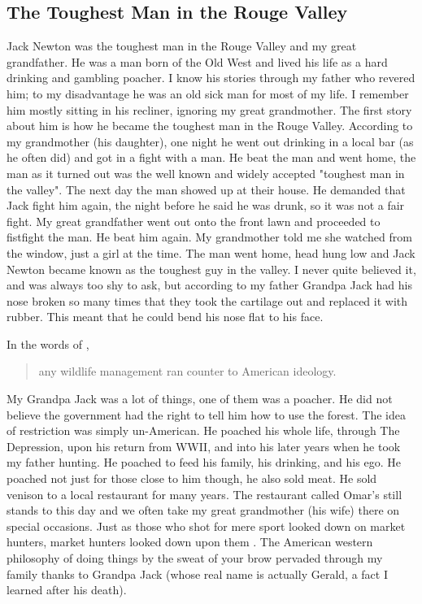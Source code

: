 \documentclass[
    a4paper,
    12pt,
    man,
    donotrepeattitle
]{apa6}
\let \cite \parencite
\begin{document}
\subsection{The Toughest Man in the Rouge Valley}

Jack Newton was the toughest man in the Rouge Valley and my great grandfather.
He was a man born of the Old West and lived his life as a hard drinking and
gambling poacher. I know his stories through my father who revered him; to my
disadvantage he was an old sick man for most of my life. I remember him mostly
sitting in his recliner, ignoring my great grandmother. The first story about
him is how he became the toughest man in the Rouge Valley. According to my
grandmother (his daughter), one night he went out drinking in a local bar (as
he often did) and got in a fight with a man. He beat the man and went home, the
man as it turned out was the well known and widely accepted "toughest man in
the valley". The next day the man showed up at their house. He demanded that
Jack fight him again, the night before he said he was drunk, so it was not
a fair fight. My great grandfather went out onto the front lawn and proceeded
to fistfight the man. He beat him again. My grandmother told me she watched
from the window, just a girl at the time. The man went home, head hung low and
Jack Newton became known as the toughest guy in the valley. I never quite
believed it, and was always too shy to ask, but according to my father Grandpa
Jack had his nose broken so many times that they took the cartilage out and
replaced it with rubber. This meant that he could bend his nose flat to his
face.

In the words of \textcite[p. 12]{s10}, \blockquote{any wildlife management ran 
counter 
to American ideology.} My Grandpa Jack was a lot of things, 
one of them was
a poacher. He did not believe the government had the right to tell him how to
use the forest. The idea of restriction was simply un-American. He poached his
whole life, through The Depression, upon his return from WWII, and into his
later years when he took my father hunting. He poached to feed his family, his
drinking, and his ego. He poached not just for those close to him though, he
also sold meat. He sold venison to a local restaurant for many years. The
restaurant called Omar's still stands to this day and we often take my great
grandmother (his wife) there on special occasions. Just as those who shot for
mere sport looked down on market hunters, market hunters looked down upon them
\cite[p. 26]{s10}. The American western philosophy of doing things by the sweat
of your
brow pervaded through my family thanks to Grandpa Jack (whose real name is
actually Gerald, a fact I learned after his death).
\end{document}
